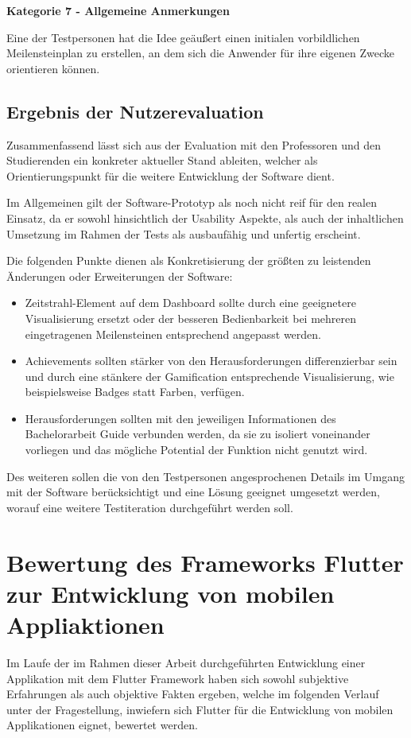 \documentclass[bibliography=totoc,listof=totoc,BCOR=5mm,DIV=12,oneside]{scrbook}
\begin{document}
\par \bigskip \textbf{Kategorie 7 - Allgemeine Anmerkungen}
\par Eine der Testpersonen hat die Idee geäußert einen initialen vorbildlichen Meilensteinplan zu erstellen, an dem sich die Anwender für ihre eigenen Zwecke orientieren können.

\newpage
\subsection{Ergebnis der Nutzerevaluation}
\par Zusammenfassend lässt sich aus der Evaluation mit den Professoren und den Studierenden ein konkreter aktueller Stand ableiten, welcher als Orientierungspunkt für die weitere Entwicklung der Software dient.
\par \bigskip Im Allgemeinen gilt der Software-Prototyp als noch nicht reif für den realen Einsatz, da er sowohl hinsichtlich der Usability Aspekte, als auch der inhaltlichen Umsetzung im Rahmen der Tests als ausbaufähig und unfertig erscheint.
\par \bigskip Die folgenden Punkte dienen als Konkretisierung der größten zu leistenden Änderungen oder Erweiterungen der Software:

\begin{itemize}
\item Zeitstrahl-Element auf dem Dashboard sollte durch eine geeignetere Visualisierung ersetzt oder der besseren Bedienbarkeit bei mehreren eingetragenen Meilensteinen entsprechend angepasst werden.
\item Achievements sollten stärker von den Herausforderungen differenzierbar sein und durch eine stänkere der Gamification entsprechende Visualisierung, wie beispielsweise Badges statt Farben, verfügen.
\item Herausforderungen sollten mit den jeweiligen Informationen des Bachelorarbeit Guide verbunden werden, da sie zu isoliert voneinander vorliegen und das mögliche Potential der Funktion nicht genutzt wird.
\end{itemize}

\par Des weiteren sollen die von den Testpersonen angesprochenen Details im Umgang mit der Software berücksichtigt und eine Lösung geeignet umgesetzt werden, worauf eine weitere Testiteration durchgeführt werden soll.

\newpage
\section{Bewertung des Frameworks Flutter zur Entwicklung von mobilen Appliaktionen}
\par Im Laufe der im Rahmen dieser Arbeit durchgeführten Entwicklung einer Applikation mit dem Flutter Framework haben sich sowohl subjektive Erfahrungen als auch objektive Fakten ergeben, welche im folgenden Verlauf unter der Fragestellung, inwiefern sich Flutter für die Entwicklung von mobilen Applikationen eignet, bewertet werden.
\end{document}
